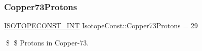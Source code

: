 \subsubsection{\texorpdfstring{Copper73\+Protons}{Copper73Protons}}
{\footnotesize\ttfamily \mbox{\hyperlink{group___isotope_const-_macros_ga5f18360b3e99483a35c32d789e62621c}{I\+S\+O\+T\+O\+P\+E\+C\+O\+N\+S\+T\+\_\+\+I\+NT}} Isotope\+Const\+::\+Copper73\+Protons = 29}

\$ \$ Protons in Copper-\/73. 